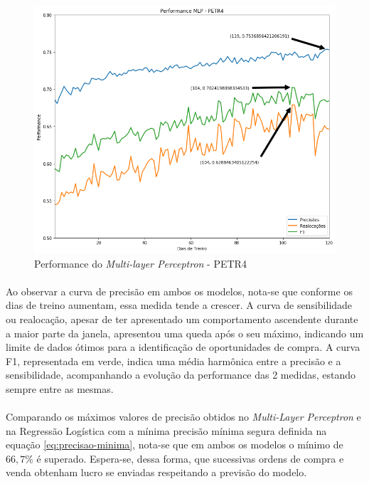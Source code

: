 \documentclass[grad,numbers]{coppe}
\begin{document}
            \begin{figure}[h!]
                \caption{Performance do \textit{Multi-layer Perceptron} - PETR4}
                \label{img:performance-mlp}
                \includegraphics[width=13.1cm]{mlp-performance.png}
                \centering
            \end{figure}
            
            \paragraph{}Ao observar a curva de precisão em ambos os modelos, nota-se que conforme os dias de treino aumentam, essa medida tende a crescer. A curva de sensibilidade ou realocação, apesar de ter apresentado um comportamento ascendente durante a maior parte da janela, apresentou uma queda após o seu máximo, indicando um limite de dados ótimos para a identificação de oportunidades de compra. A curva F1, representada em verde, indica uma média harmônica entre a precisão e a sensibilidade, acompanhando a evolução da performance das 2 medidas, estando sempre entre as mesmas.
            
            \paragraph{}Comparando os máximos valores de precisão obtidos no \textit{Multi-Layer Perceptron} e na Regressão Logística com a mínima precisão mínima segura definida na equação \ref{eq:precisao-minima}, nota-se que em ambos os modelos o mínimo de $66,7\%$ é superado. Espera-se, dessa forma, que sucessivas ordens de compra e venda obtenham lucro se enviadas respeitando a previsão do modelo.
            
\end{document}
